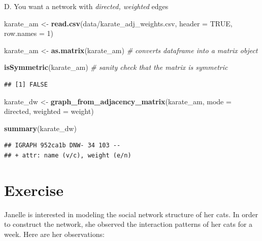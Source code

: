 \documentclass[
]{book}
\newenvironment{Shaded}{\begin{snugshade}}{\end{snugshade}}
\newcommand{\AttributeTok}[1]{\textcolor[rgb]{0.13,0.29,0.53}{#1}}
\newcommand{\CommentTok}[1]{\textcolor[rgb]{0.56,0.35,0.01}{\textit{#1}}}
\newcommand{\ConstantTok}[1]{\textcolor[rgb]{0.56,0.35,0.01}{#1}}
\newcommand{\DecValTok}[1]{\textcolor[rgb]{0.00,0.00,0.81}{#1}}
\newcommand{\FunctionTok}[1]{\textcolor[rgb]{0.13,0.29,0.53}{\textbf{#1}}}
\newcommand{\NormalTok}[1]{#1}
\newcommand{\OtherTok}[1]{\textcolor[rgb]{0.56,0.35,0.01}{#1}}
\newcommand{\StringTok}[1]{\textcolor[rgb]{0.31,0.60,0.02}{#1}}
\begin{document}
D. You want a network with \emph{directed, weighted} edges

\begin{Shaded}
\begin{Highlighting}[]
\NormalTok{karate\_am }\OtherTok{\textless{}{-}} \FunctionTok{read.csv}\NormalTok{(}\StringTok{\textquotesingle{}data/karate\_adj\_weights.csv\textquotesingle{}}\NormalTok{, }\AttributeTok{header =} \ConstantTok{TRUE}\NormalTok{, }\AttributeTok{row.names =} \DecValTok{1}\NormalTok{)}

\NormalTok{karate\_am }\OtherTok{\textless{}{-}} \FunctionTok{as.matrix}\NormalTok{(karate\_am) }\CommentTok{\# converts dataframe into a matrix object}

\FunctionTok{isSymmetric}\NormalTok{(karate\_am) }\CommentTok{\# sanity check that the matrix is symmetric }
\end{Highlighting}
\end{Shaded}

\begin{verbatim}
## [1] FALSE
\end{verbatim}

\begin{Shaded}
\begin{Highlighting}[]
\NormalTok{karate\_dw }\OtherTok{\textless{}{-}} \FunctionTok{graph\_from\_adjacency\_matrix}\NormalTok{(karate\_am, }\AttributeTok{mode =} \StringTok{\textquotesingle{}directed\textquotesingle{}}\NormalTok{, }\AttributeTok{weighted =} \StringTok{\textquotesingle{}weight\textquotesingle{}}\NormalTok{)}

\FunctionTok{summary}\NormalTok{(karate\_dw)}
\end{Highlighting}
\end{Shaded}

\begin{verbatim}
## IGRAPH 952ca1b DNW- 34 103 -- 
## + attr: name (v/c), weight (e/n)
\end{verbatim}

\section{Exercise}\label{exercise-4}

Janelle is interested in modeling the social network structure of her cats. In order to construct the network, she observed the interaction patterns of her cats for a week. Here are her observations:
\end{document}
